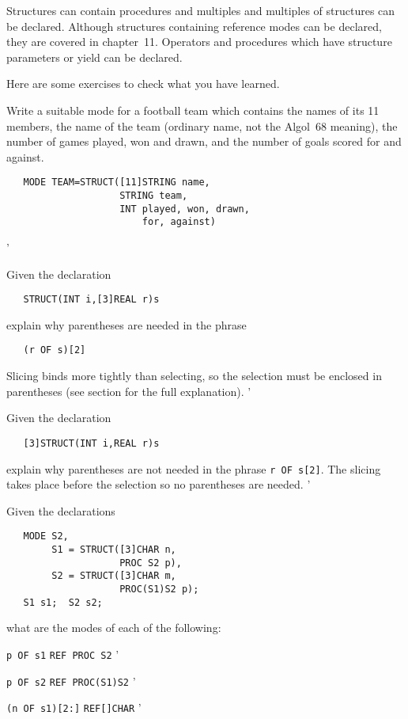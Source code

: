 Structures can contain procedures and multiples and multiples of
structures can be declared. Although structures containing reference
modes can be declared, they are covered in chapter~11. Operators and
procedures which have structure parameters or yield can be declared.

Here are some exercises to check what you have learned.

\begin{exercise}
\item Write a suitable mode for a football team which contains the
names of its 11 members, the name of the team (ordinary name, not the
Algol~68 meaning), the number of games played, won and drawn, and the
number of goals scored for and against.
\ans \ %
\begin{verbatim}
   MODE TEAM=STRUCT([11]STRING name,
                    STRING team,
                    INT played, won, drawn,
                        for, against)
\end{verbatim}
'
\item Given the declaration
\begin{verbatim}
   STRUCT(INT i,[3]REAL r)s
\end{verbatim}
\noindent
explain why parentheses are needed in the phrase
\begin{verbatim}
   (r OF s)[2]
\end{verbatim}
\indent\ans Slicing binds more tightly than selecting, so the
selection must be enclosed in parentheses (see section
 for the full explanation).
'
\item Given the declaration
\begin{verbatim}
   [3]STRUCT(INT i,REAL r)s
\end{verbatim}
\noindent
explain why parentheses are not needed in the phrase
\verb|r OF s[2]|.  \ans The slicing takes place before the selection
so no parentheses are needed.
'
\item Given the declarations
\begin{verbatim}
   MODE S2,
        S1 = STRUCT([3]CHAR n,
                    PROC S2 p),
        S2 = STRUCT([3]CHAR m,
                    PROC(S1)S2 p);
   S1 s1;  S2 s2;
\end{verbatim}
\noindent
what are the modes of each of the following:
\begin{subex}
\item \verb|p OF s1| \subans \verb|REF PROC S2|
'
\item \verb|p OF s2| \subans \verb|REF PROC(S1)S2|
'
\item \verb|(n OF s1)[2:]| \subans \verb|REF[]CHAR|
'
\end{subex}
\end{exercise}

